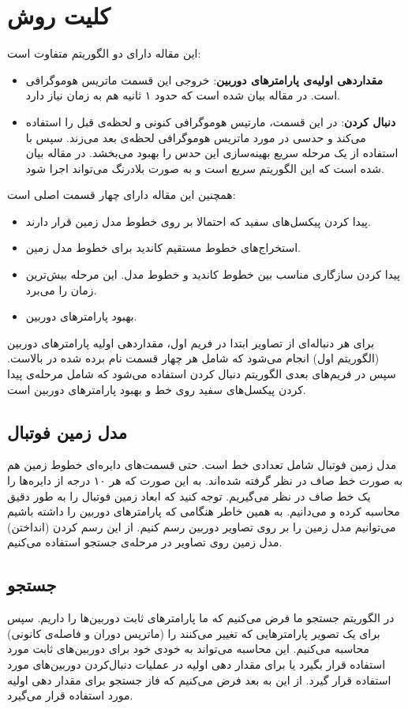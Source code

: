 \documentclass{report}
\begin{document}
\section{کلیت روش}
این مقاله دارای دو الگوریتم متفاوت است:
\begin{itemize}
\item
\textbf{مقداردهی اولیه‌ی پارامترهای دوربین}: خروجی این قسمت ماتریس هوموگرافی است. در مقاله بیان شده است که حدود ۱ ثانیه هم به زمان نیاز دارد.
\item
\textbf{دنبال کردن}: در این قسمت، مارتیس هوموگرافی کنونی و لحظه‌ی قبل را استفاده می‌کند و حدسی در مورد ماتریس هوموگرافی لحظه‌ی بعد می‌زند. سپس با استفاده از یک مرحله سریع بهینه‌سازی این حدس را بهبود می‌بخشد. در مقاله بیان شده است که این الگوریتم سریع است و به صورت بلادرنگ می‌تواند اجرا شود.
\end{itemize}
همچنین این مقاله دارای چهار قسمت اصلی است:
\begin{itemize}
\item
پیدا کردن پیکسل‌های سفید که احتمالا بر روی خطوط مدل زمین قرار دارند.
\item
استخراج‌های خطوط مستقیم کاندید برای خطوط مدل زمین.
\item
پیدا کردن سازگاری مناسب بین خطوط کاندید و خطوط مدل. این مرحله بیش‌ترین زمان را می‌برد.
\item
بهبود پارامترهای دوربین.
\end{itemize}
برای هر دنباله‌ای از تصاویر ابتدا در فریم اول، مقداردهی اولیه پارامترهای دوربین (الگوریتم اول) انجام می‌شود که شامل هر چهار قسمت نام برده شده در بالاست. سپس در فریم‌های بعدی الگوریتم دنبال کردن استفاده می‌شود که شامل مرحله‌ی پیدا کردن پیکسل‌های سفید روی خط و بهبود پارامترهای دوربین است.

\subsection{مدل زمین فوتبال}
مدل زمین فوتبال شامل تعدادی خط است. حتی قسمت‌های دایر‌ه‌ای خطوط زمین هم به صورت خط صاف در نظر گرفته شده‌اند. به این صورت که هر ۱۰ درجه از دایره‌ها را یک خط صاف در نظر می‌گیریم. توجه کنید که ابعاد زمین فوتبال را به طور دقیق محاسبه کرده‌ و می‌دانیم. به همین خاطر هنگامی که پارامترهای دوربین را داشته باشیم می‌توانیم مدل زمین را بر روی تصاویر دوربین رسم کنیم. از این رسم کردن (انداختن) مدل زمین روی تصاویر در مرحله‌ی جستجو استفاده می‌کنیم.
\subsection{جستجو}
در الگوریتم جستجو ما فرض می‌کنیم که ما پارامترهای ثابت دوربین‌ها را داریم. سپس برای یک تصویر پارامترهایی که تغییر می‌کنند را (ماتریس دوران و فاصله‌ی کانونی) محاسبه می‌کنیم. این محاسبه می‌تواند به خودی خود برای دوربین‌های ثابت مورد استفاده قرار بگیرد یا برای مقدار دهی اولیه در عملیات دنبال‌کردن دوربین‌های مورد استفاده قرار گیرد. از این به بعد فرض می‌کنیم که فاز جستجو برای مقدار دهی اولیه مورد استفاده قرار می‌گیرد.
\end{document}
